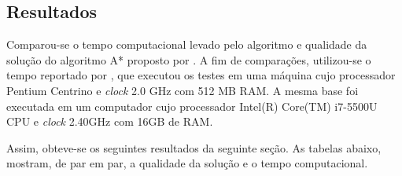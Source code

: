\documentclass[12pt]{article}
\begin{document}
	\subsection{Resultados}\label{sec:resultados}
		
		Comparou-se o tempo computacional levado pelo algoritmo e qualidade da solução do algoritmo A* proposto por \cite{chang:1996}. A fim de comparações, utilizou-se o tempo reportado por \cite{consoli:2009}, que executou os testes em uma máquina cujo processador Pentium Centrino e \textit{clock} 2.0 GHz com 512 MB RAM. A mesma base foi executada em um computador cujo processador Intel(R) Core(TM) i7-5500U CPU e \textit{clock} 2.40GHz com 16GB de RAM.

		Assim, obteve-se os seguintes resultados da seguinte seção. As tabelas abaixo, mostram, de par em par, a qualidade da solução e o tempo computacional.
\end{document}
